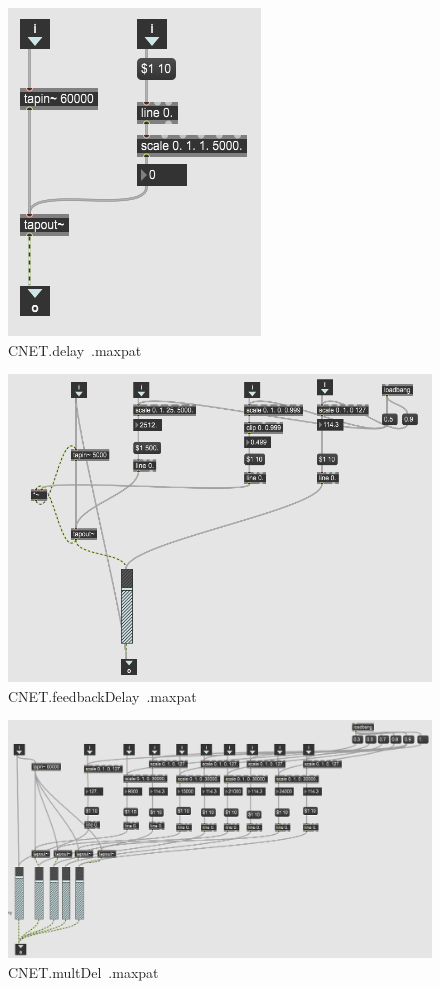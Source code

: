 \begin{figure}
    \centering
    \includegraphics{diagrams/maxPatches/CNET.delay~.png}
    \caption{CNET.delay~.maxpat}
    \label{fig:delMaxpat}
\end{figure}

\begin{figure}
    \centering
    \includegraphics{diagrams/maxPatches/CNET.feedbackDelay~.png}
    \caption{CNET.feedbackDelay~.maxpat}
    \label{fig:fbDelMaxpat}
\end{figure}

\begin{figure}
    \centering
    \includegraphics[scale=0.7]{diagrams/maxPatches/CNET.multDel~.png}
    \caption{CNET.multDel~.maxpat}
    \label{fig:multDel}
\end{figure}

